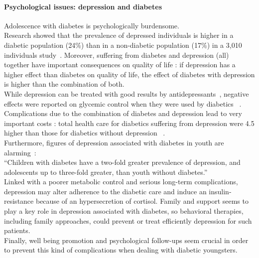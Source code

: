 \paragraph{Psychological issues: depression and diabetes}
Adolescence with diabetes is psychologically burdensome. 
\\
Research showed that the prevalence of depressed individuals is higher in a diabetic population (24\%) than in a non-diabetic population (17\%) in a 3,010 individuals study~\cite{goldney2004diabetes}. Moreover, suffering from diabetes and depression (all) together have important consequences on quality of life : if depression has a higher effect than diabetes on quality of life, the effect of diabetes with depression is higher than the combination of both. 
\\
While depression can be treated with good results by antidepressants~\cite{Goodnick2000}, negative effects were reported on glycemic control when they were used by diabetics ~\cite{Lustman2002917}. Complications due to the combination of diabetes and depression lead to very important costs : total health care for diabetics suffering from depression were 4.5 higher than those for diabetics without depression ~\cite{egede2002comorbid}.
\\
Furthermore, figures of depression associated with diabetes in youth are alarming~\cite{Grey2002907}:\\
``Children with diabetes have a two-fold greater prevalence of depression, and adolescents up to three-fold greater, than youth without diabetes.''\\
Linked with a poorer metabolic control and serious long-term complications, depression may alter adherence to the diabetic care and induce an insulin-resistance because of an hypersecretion of cortisol. Family and support seems to play a key role in depression associated with diabetes, so behavioral therapies, including family approaches, could prevent or treat efficiently depression for such patients.
\\
Finally, well being promotion and psychological follow-ups seem crucial in order to prevent this kind of complications when dealing with diabetic youngsters.
\\


